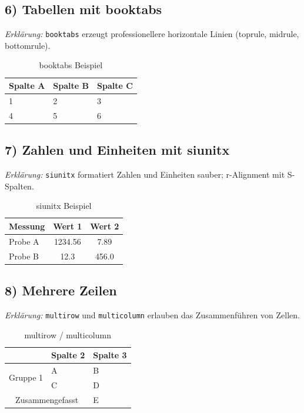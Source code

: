 \documentclass[a4paper,12pt]{article}
\begin{document}
\subsection*{6) Tabellen mit booktabs}
	\textit{Erklärung:} \texttt{booktabs} erzeugt professionellere horizontale Linien (toprule, midrule, bottomrule).
\begin{table}[h!]
	\centering
	\caption{booktabs Beispiel}
	\begin{tabular}{lll}
		
		Spalte A & Spalte B & Spalte C \\
		\midrule
		1 & 2 & 3 \\
		4 & 5 & 6 \\
		\bottomrule
	\end{tabular}
\end{table}

\newpage

\subsection*{7) Zahlen und Einheiten mit siunitx}
	\textit{Erklärung:} \texttt{siunitx} formatiert Zahlen und Einheiten sauber; r-Alignment mit S-Spalten.
\begin{table}[h!]
	\centering
	\caption{siunitx Beispiel}
	\begin{tabular}{l S S}
	
		Messung & {Wert 1} & {Wert 2} \\
		\midrule
		Probe A & 1234.56 & 7.89 \\
		Probe B & 12.3 & 456.0 \\
		\bottomrule
	\end{tabular}
\end{table}

\subsection*{8) Mehrere Zeilen }
	\textit{Erklärung:} \texttt{multirow} und \texttt{multicolumn} erlauben das Zusammenführen von Zellen.
	\begin{table}[h!]
	\centering
	\caption{multirow / multicolumn}
	\begin{tabular}{lll}
			\toprule
		& Spalte 2 & Spalte 3 \\
		\midrule
		\multirow{2}{*}{Gruppe 1} & A & B \\
		 & C & D \\
		\midrule
		\multicolumn{2}{c}{Zusammengefasst} & E \\
		\bottomrule
	\end{tabular}
\end{table}
\end{document}
